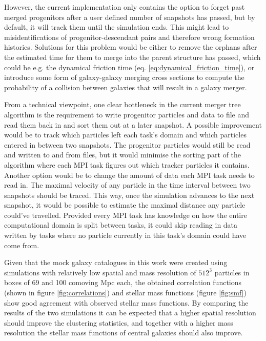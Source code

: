 However, the current implementation only contains the option to forget past merged progenitors after a user defined number of snapshots has passed, but by default, it will track them until the simulation ends.
This might lead to misidentifications of progenitor-descendant pairs and therefore wrong formation histories.
Solutions for this problem would be either to remove the orphans after the estimated time for them to merge into the parent structure has passed, which could be e.g. the dynamical friction time (eq. \eqref{eq:dynamical_friction_time}), or introduce some form of galaxy-galaxy merging cross sections to compute the probability of a collision between galaxies that will result in a galaxy merger.

From a technical viewpoint, one clear bottleneck in the current merger tree algorithm is the requirement to write progenitor particles and data to file and read them back in and sort them out at a later snapshot. 
A possible improvement would be to track which particles left each task’s domain and which particles entered in between two snapshots. The progenitor particles would still be read and written to and from files, but it would minimise the sorting part of the algorithm where each MPI task figures out which tracker particles it contains.
Another option would be to change the amount of data each MPI task needs to read in. 
The maximal velocity of any particle in the time interval between two snapshots should be traced. This way, once the simulation advances to the next snapshot, it would be possible to estimate the maximal distance any particle could’ve travelled.
Provided every MPI task has knowledge on how the entire computational domain is split between tasks, it could skip reading in data written by tasks where no particle currently in this task’s domain could have come from.



Given that the mock galaxy catalogues in this work were created using simulations with relatively low spatial and mass resolution of $512^3$ particles in boxes of 69 and 100 comoving Mpc each, the obtained correlation functions (shown in figure \ref{fig:correlations}) and stellar mass functions (figure \ref{fig:smf}) show good agreement with observed stellar mass functions.
By comparing the results of the two simulations it can be expected that a higher spatial resolution should improve the clustering statistics, and together with a higher mass resolution the stellar mass functions of central galaxies should also improve.





